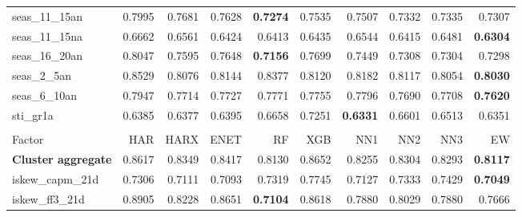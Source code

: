 \begin{longtable}{>{\raggedright\arraybackslash}p{2.6cm}rrrrrrrrr}
seas\_11\_15an & 0.7995 & \cellcolor{blue!10}0.7681 & \cellcolor{blue!10}0.7628 & \textbf{\cellcolor{blue!10}0.7274} & \cellcolor{blue!10}0.7535 & \cellcolor{blue!10}0.7507 & \cellcolor{blue!10}0.7332 & \cellcolor{blue!10}0.7335 & \cellcolor{blue!10}0.7307 \\
seas\_11\_15na & 0.6662 & \cellcolor{blue!10}0.6561 & \cellcolor{blue!10}0.6424 & \cellcolor{blue!10}0.6413 & \cellcolor{blue!10}0.6435 & \cellcolor{blue!10}0.6544 & \cellcolor{blue!10}0.6415 & \cellcolor{blue!10}0.6481 & \textbf{\cellcolor{blue!10}0.6304} \\
seas\_16\_20an & 0.8047 & \cellcolor{blue!10}0.7595 & \cellcolor{blue!10}0.7648 & \textbf{\cellcolor{blue!10}0.7156} & \cellcolor{blue!10}0.7699 & \cellcolor{blue!10}0.7449 & \cellcolor{blue!10}0.7308 & \cellcolor{blue!10}0.7304 & \cellcolor{blue!10}0.7298 \\
seas\_2\_5an & 0.8529 & \cellcolor{blue!10}0.8076 & \cellcolor{blue!10}0.8144 & \cellcolor{blue!10}0.8377 & \cellcolor{blue!10}0.8120 & \cellcolor{blue!10}0.8182 & \cellcolor{blue!10}0.8117 & \cellcolor{blue!10}0.8054 & \textbf{\cellcolor{blue!10}0.8030} \\
seas\_6\_10an & 0.7947 & \cellcolor{blue!10}0.7714 & \cellcolor{blue!10}0.7727 & \cellcolor{blue!10}0.7771 & \cellcolor{blue!10}0.7755 & \cellcolor{blue!10}0.7796 & \cellcolor{blue!10}0.7690 & \cellcolor{blue!10}0.7708 & \textbf{\cellcolor{blue!10}0.7620} \\
sti\_gr1a & 0.6385 & \cellcolor{blue!10}0.6377 & 0.6395 & 0.6658 & 0.7251 & \textbf{\cellcolor{blue!10}0.6331} & 0.6601 & 0.6513 & \cellcolor{blue!10}0.6351 \\
\hline
\multicolumn{10}{@{}l}{\textit{Panel K. Short-Term Reversal}} \\
\hline
Factor & HAR & HARX & ENET & RF & XGB & NN1 & NN2 & NN3 & EW \\
\hline
\textbf{Cluster aggregate} & 0.8617 & \cellcolor{blue!10}0.8349 & \cellcolor{blue!10}0.8417 & \cellcolor{blue!10}0.8130 & 0.8652 & \cellcolor{blue!10}0.8255 & \cellcolor{blue!10}0.8304 & \cellcolor{blue!10}0.8293 & \textbf{\cellcolor{blue!10}0.8117} \\
iskew\_capm\_21d & 0.7306 & \cellcolor{blue!10}0.7111 & \cellcolor{blue!10}0.7093 & 0.7319 & 0.7745 & \cellcolor{blue!10}0.7127 & 0.7333 & 0.7429 & \textbf{\cellcolor{blue!10}0.7049} \\
iskew\_ff3\_21d & 0.8905 & \cellcolor{blue!10}0.8228 & \cellcolor{blue!10}0.8651 & \textbf{\cellcolor{blue!10}0.7104} & \cellcolor{blue!10}0.8618 & \cellcolor{blue!10}0.7880 & \cellcolor{blue!10}0.8029 & \cellcolor{blue!10}0.7880 & \cellcolor{blue!10}0.7666 \\

\end{longtable}
